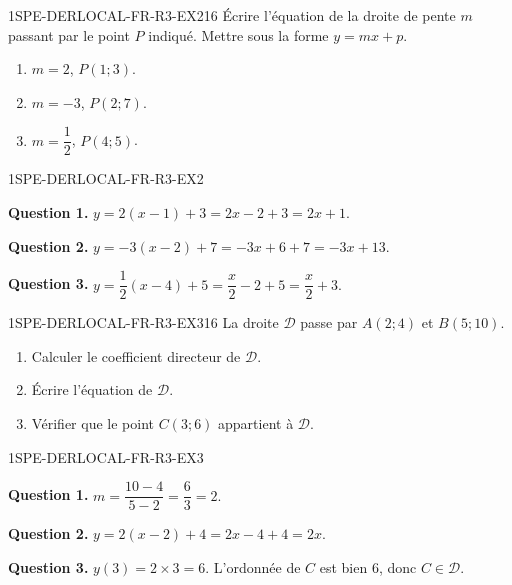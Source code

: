 
\begin{exercice}{1SPE-DERLOCAL-FR-R3-EX2}{1}{6}
Écrire l'équation de la droite de pente $m$ passant par le point $P$ indiqué. Mettre sous la forme $y = mx + p$.
\begin{enumerate}
  \item $m = 2$, $P(1;3)$.
  \item $m = -3$, $P(2;7)$.
  \item $m = \dfrac{1}{2}$, $P(4;5)$.
\end{enumerate}
\end{exercice}


\begin{corrige}{1SPE-DERLOCAL-FR-R3-EX2}


\textbf{Question 1.}
$y = 2(x - 1) + 3 = 2x - 2 + 3 = 2x + 1.$

\textbf{Question 2.}
$y = -3(x - 2) + 7 = -3x + 6 + 7 = -3x + 13.$

\textbf{Question 3.}
$y = \dfrac{1}{2}(x - 4) + 5 = \dfrac{x}{2} - 2 + 5 = \dfrac{x}{2} + 3.$

\end{corrige}


\begin{exercice}{1SPE-DERLOCAL-FR-R3-EX3}{1}{6}
La droite $\mathcal{D}$ passe par $A(2;4)$ et $B(5;10)$.
\begin{enumerate}
  \item Calculer le coefficient directeur de $\mathcal{D}$.
  \item Écrire l'équation de $\mathcal{D}$.
  \item Vérifier que le point $C(3;6)$ appartient à $\mathcal{D}$.
\end{enumerate}
\end{exercice}


\begin{corrige}{1SPE-DERLOCAL-FR-R3-EX3}

\textbf{Question 1.}
$m = \dfrac{10-4}{5-2} = \dfrac{6}{3} = 2.$

\textbf{Question 2.}
$y = 2(x - 2) + 4 = 2x - 4 + 4 = 2x.$


\textbf{Question 3.}
$y(3) = 2 \times 3 = 6$. L'ordonnée de $C$ est bien $6$, donc $C \in \mathcal{D}$. \checkmark

\end{corrige}

